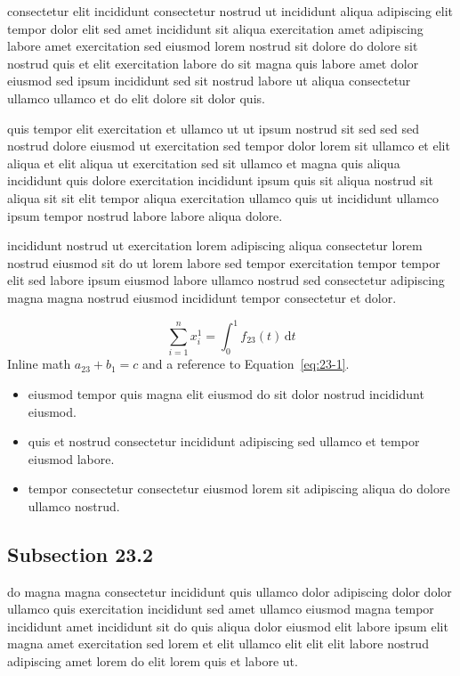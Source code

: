 \documentclass{article}
\begin{document}
consectetur elit incididunt consectetur nostrud ut incididunt aliqua adipiscing elit tempor dolor elit sed amet incididunt sit aliqua exercitation amet adipiscing labore amet exercitation sed eiusmod lorem nostrud sit dolore do dolore sit nostrud quis et elit exercitation labore do sit magna quis labore amet dolor eiusmod sed ipsum incididunt sed sit nostrud labore ut aliqua consectetur ullamco ullamco et do elit dolore sit dolor quis.

quis tempor elit exercitation et ullamco ut ut ipsum nostrud sit sed sed sed nostrud dolore eiusmod ut exercitation sed tempor dolor lorem sit ullamco et elit aliqua et elit aliqua ut exercitation sed sit ullamco et magna quis aliqua incididunt quis dolore exercitation incididunt ipsum quis sit aliqua nostrud sit aliqua sit sit elit tempor aliqua exercitation ullamco quis ut incididunt ullamco ipsum tempor nostrud labore labore aliqua dolore.

incididunt nostrud ut exercitation lorem adipiscing aliqua consectetur lorem nostrud eiusmod sit do ut lorem labore sed tempor exercitation tempor tempor elit sed labore ipsum eiusmod labore ullamco nostrud sed consectetur adipiscing magna magna nostrud eiusmod incididunt tempor consectetur et dolor.

\begin{equation}\label{eq:23-1}
  \sum_{i=1}^{n} x_i^{1} = \int_0^1 f_{23}(t)\,\mathrm{d}t
\end{equation}
Inline math $a_{23} + b_{1} = c$ and a reference to Equation~\eqref{eq:23-1}.

\begin{itemize}
  \item eiusmod tempor quis magna elit eiusmod do sit dolor nostrud incididunt eiusmod.
  \item quis et nostrud consectetur incididunt adipiscing sed ullamco et tempor eiusmod labore.
  \item tempor consectetur consectetur eiusmod lorem sit adipiscing aliqua do dolore ullamco nostrud.
\end{itemize}

\subsection{Subsection 23.2}\label{sec:23-2}
do magna magna consectetur incididunt quis ullamco dolor adipiscing dolor dolor ullamco quis exercitation incididunt sed amet ullamco eiusmod magna tempor incididunt amet incididunt sit do quis aliqua dolor eiusmod elit labore ipsum elit magna amet exercitation sed lorem et elit ullamco elit elit elit labore nostrud adipiscing amet lorem do elit lorem quis et labore ut.
\end{document}
